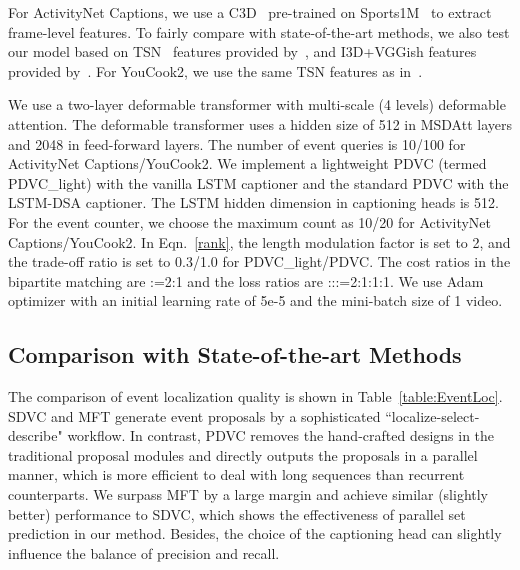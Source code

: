 \vspace{0.5em}
For ActivityNet Captions, we use a C3D~\cite{tran2015learning} pre-trained on Sports1M~\cite{karpathy2014large} to extract frame-level features. To fairly compare with state-of-the-art methods, we also test our model based on TSN~\cite{wang2018temporal} features provided by~\cite{zhou2018end}, and I3D+VGGish features provided by~\cite{Iashin2020better}. For YouCook2, we use the same TSN features as in~\cite{zhou2018end}. 

We use a two-layer deformable transformer with multi-scale (4 levels) deformable attention. The deformable transformer uses a hidden size of 512 in MSDAtt layers and 2048 in feed-forward layers. The number of event queries is 10/100 for ActivityNet Captions/YouCook2. We implement a lightweight PDVC (termed PDVC\_light) with the vanilla LSTM captioner and the standard PDVC with the LSTM-DSA captioner. The LSTM hidden dimension in captioning heads is 512. For the event counter, we choose the maximum count as 10/20 for ActivityNet Captions/YouCook2. In Eqn.~\ref{rank}, the length modulation factor  is set to 2, and the trade-off ratio  is set to 0.3/1.0 for PDVC\_light/PDVC. The cost ratios in the bipartite matching are :=2:1 and the loss ratios are :::=2:1:1:1. We use Adam~\cite{kingma2015adam} optimizer with an initial learning rate of 5e-5 and the mini-batch size of 1 video.

\subsection{Comparison with State-of-the-art Methods}

\vspace{0.5em}
 The comparison of event localization quality is shown in Table~\ref{table:EventLoc}. SDVC and MFT generate event proposals by a sophisticated ``localize-select-describe" workflow. 
In contrast, PDVC removes the hand-crafted designs in the traditional proposal modules and directly outputs the proposals in a parallel manner, which is more efficient to deal with long sequences than recurrent counterparts. We surpass MFT by a large margin and achieve similar (slightly better) performance to SDVC, which shows the effectiveness of parallel set prediction in our method. Besides, the choice of the captioning head can slightly influence the balance of precision and recall. 

